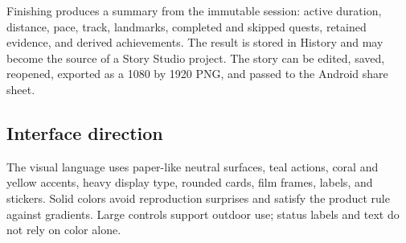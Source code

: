 Finishing produces a summary from the immutable session: active duration,
distance, pace, track, landmarks, completed and skipped quests, retained evidence,
and derived achievements. The result is stored in History and may become the
source of a Story Studio project. The story can be edited, saved, reopened,
exported as a 1080 by 1920 PNG, and passed to the Android share sheet.


\subsection{Interface direction}
The visual language uses paper-like neutral surfaces, teal actions, coral and
yellow accents, heavy display type, rounded cards, film frames, labels, and
stickers. Solid colors avoid reproduction surprises and satisfy the product rule
against gradients. Large controls support outdoor use; status labels and text do
not rely on color alone.
